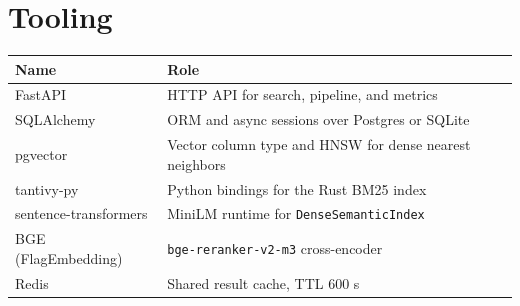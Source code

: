 \section{Tooling}\label{tooling}

\begin{longtable}[]{@{}ll@{}}
\toprule\noalign{}
Name & Role \\
\midrule\noalign{}
\endhead
\bottomrule\noalign{}
\endlastfoot
FastAPI & HTTP API for search, pipeline, and metrics \\
SQLAlchemy & ORM and async sessions over Postgres or SQLite \\
pgvector & Vector column type and HNSW for dense nearest neighbors \\
tantivy-py & Python bindings for the Rust BM25 index \\
sentence-transformers & MiniLM runtime for \texttt{DenseSemanticIndex} \\
BGE (FlagEmbedding) & \texttt{bge-reranker-v2-m3} cross-encoder \\
Redis & Shared result cache, TTL 600 s \\
\end{longtable}
